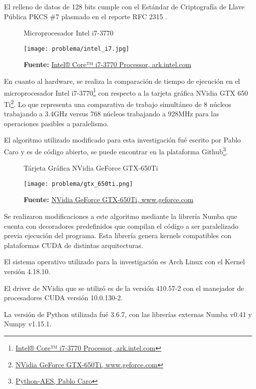 \documentclass[../main/main.tex]{subfiles}
\begin{document}
  El relleno de datos de 128 bits cumple con el Estándar de Criptografía de Llave Pública PKCS \#7 plasmado en el reporte RFC 2315 \cite{report:RFC_2315}.

  \begin{figure}[H]
    \centering
    \caption{Microprocesador Intel i7-3770}
    \texttt{[image: problema/intel\_i7.jpg]}
    \caption*{\textbf{Fuente:} \href{https://tinyurl.com/yb3tqpvu}{Intel® Core™ i7-3770 Processor, ark.intel.com}}
  \end{figure}

  En cuanto al hardware, se realiza la comparación de tiempo de ejecución en el microprocesador Intel i7-3770\footnote{\href{https://tinyurl.com/yb3tqpvu}{Intel® Core™ i7-3770 Processor, ark.intel.com}} con respecto a la tarjeta gráfica NVidia GTX 650 Ti\footnote{\href{https://tinyurl.com/ycr3kouv}{NVidia GeForce GTX-650Ti, www.geforce.com}}. Lo que representa una comparativa de trabajo simultáneo de 8 núcleos trabajando a 3.4GHz versus 768 núcleos trabajando a 928MHz para las operaciones pasibles a paralelismo.

  El algoritmo utilizado modificado para esta investigación fué escrito por Pablo Caro y es de código abierto, se puede encontrar en la plataforma Github\footnote{\href{https://github.com/pcaro90/Python-AES}{Python-AES, Pablo Caro}}.

  \begin{figure}[H]
    \centering
    \caption{Tárjeta Gráfica NVidia GeForce GTX-650Ti}
    \texttt{[image: problema/gtx\_650ti.png]}
    \caption*{\textbf{Fuente:} \href{https://tinyurl.com/ycr3kouv}{NVidia GeForce GTX-650Ti, www.geforce.com}}
  \end{figure}

  Se realizaron modificaciones a este algoritmo mediante la librería Numba que cuenta con decoradores predefinidos que compilan el código a ser paralelizado previa ejecución del programa. Esta librería genera kernels compatibles con plataformas CUDA de distintas arquitecturas.

  El sistema operativo utilizado para la investigación es Arch Linux con el Kernel versión 4.18.10.
  
  El driver de NVidia que se utilizó es de la versión 410.57-2 con el manejador de procesadores CUDA versión 10.0.130-2.

  La versión de Python utilizada fué 3.6.7, con las librerías externas Numba v0.41 y Numpy v1.15.1.

  \bibliografia
\end{document}
